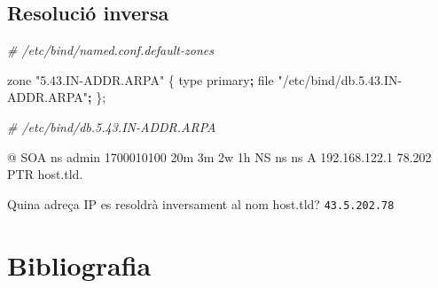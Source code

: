 \documentclass[]{article}
\newenvironment{Shaded}{}{}
\newcommand{\BuiltInTok}[1]{#1}
\newcommand{\CommentTok}[1]{\textcolor[rgb]{0.38,0.63,0.69}{\textit{#1}}}
\newcommand{\ExtensionTok}[1]{#1}
\newcommand{\FunctionTok}[1]{\textcolor[rgb]{0.02,0.16,0.49}{#1}}
\newcommand{\KeywordTok}[1]{\textcolor[rgb]{0.00,0.44,0.13}{\textbf{#1}}}
\newcommand{\NormalTok}[1]{#1}
\newcommand{\StringTok}[1]{\textcolor[rgb]{0.25,0.44,0.63}{#1}}
\begin{document}
\begin{Shaded}
\end{Shaded}

\hypertarget{resoluciuxf3-inversa}{%
\subsection{\texorpdfstring{\textbf{Resolució
inversa}}{Resolució inversa}}\label{resoluciuxf3-inversa}}

\begin{Shaded}
\begin{Highlighting}[]
\CommentTok{# /etc/bind/named.conf.default-zones}

\ExtensionTok{zone} \StringTok{"5.43.IN-ADDR.ARPA"}\NormalTok{ \{}
    \BuiltInTok{type}\NormalTok{ primary}\KeywordTok{;}
    \FunctionTok{file} \StringTok{"/etc/bind/db.5.43.IN-ADDR.ARPA"}\KeywordTok{;}
\NormalTok{\};}
\end{Highlighting}
\end{Shaded}

\begin{Shaded}
\begin{Highlighting}[]
\CommentTok{# /etc/bind/db.5.43.IN-ADDR.ARPA}

\ExtensionTok{@}\NormalTok{       SOA ns  admin   1700010100 20m 3m 2w 1h}
        \ExtensionTok{NS}\NormalTok{  ns}
\ExtensionTok{ns}\NormalTok{      A   192.168.122.1}
\ExtensionTok{78.202}\NormalTok{      PTR host.tld.}
\end{Highlighting}
\end{Shaded}

Quina adreça IP es resoldrà inversament al nom host.tld?
\texttt{43.5.202.78}

\hypertarget{bibliografia}{%
\section{\texorpdfstring{\textbf{Bibliografia}}{Bibliografia}}\label{bibliografia}}
\end{document}
